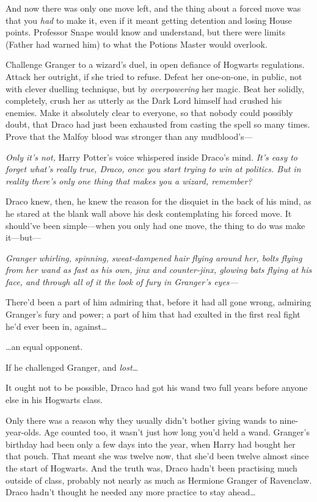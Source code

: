 And now there was only one move left, and the thing about a forced move was that you \emph{had} to make it, even if it meant getting detention and losing House points. Professor Snape would know and understand, but there were limits (Father had warned him) to what the Potions Master would overlook.

Challenge Granger to a wizard's duel, in open defiance of Hogwarts regulations. Attack her outright, if she tried to refuse. Defeat her one-on-one, in public, not with clever duelling technique, but by \emph{overpowering} her magic. Beat her solidly, completely, crush her as utterly as the Dark Lord himself had crushed his enemies. Make it absolutely clear to everyone, so that nobody could possibly doubt, that Draco had just been exhausted from casting the spell so many times. Prove that the Malfoy blood was stronger than any mudblood's—

\emph{Only it's not,} Harry Potter's voice whispered inside Draco's mind. \emph{It's easy to forget what's really true, Draco, once you start trying to win at politics. But in reality there's only one thing that makes you a wizard, remember?}

Draco knew, then, he knew the reason for the disquiet in the back of his mind, as he stared at the blank wall above his desk contemplating his forced move. It should've been simple—when you only had one move, the thing to do was make it—but—

\emph{Granger whirling, spinning, sweat-dampened hair flying around her, bolts flying from her wand as fast as his own, jinx and counter-jinx, glowing bats flying at his face, and through all of it the look of fury in Granger's eyes—}

There'd been a part of him admiring that, before it had all gone wrong, admiring Granger's fury and power; a part of him that had exulted in the first real fight he'd ever been in, against…

…an equal opponent.

If he challenged Granger, and \emph{lost…}

It ought not to be possible, Draco had got his wand two full years before anyone else in his Hogwarts class.

Only there was a reason why they usually didn't bother giving wands to nine-year-olds. Age counted too, it wasn't just how long you'd held a wand. Granger's birthday had been only a few days into the year, when Harry had bought her that pouch. That meant she was twelve now, that she'd been twelve almost since the start of Hogwarts. And the truth was, Draco hadn't been practising much outside of class, probably not nearly as much as Hermione Granger of Ravenclaw. Draco hadn't thought he needed any more practice to stay ahead…

